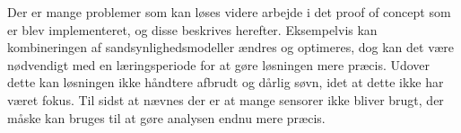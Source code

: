 Der er mange problemer som kan løses videre arbejde i det proof of concept som er blev implementeret, og disse beskrives herefter.
Eksempelvis kan kombineringen af sandsynlighedsmodeller ændres og optimeres, dog kan det være nødvendigt med en læringsperiode for at gøre løsningen mere præcis.
Udover dette kan løsningen ikke håndtere afbrudt og dårlig søvn, idet at dette ikke har været fokus.
Til sidst at nævnes der er at mange sensorer ikke bliver brugt, der måske kan bruges til at gøre analysen endnu mere præcis.